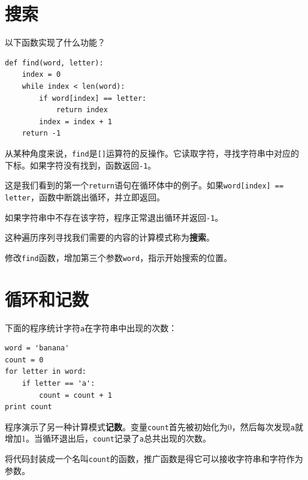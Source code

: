 

\section{搜索}
\label{查找}

以下函数实现了什么功能？


\beforeverb
\begin{verbatim}
def find(word, letter):
    index = 0
    while index < len(word):
        if word[index] == letter:
            return index
        index = index + 1
    return -1
\end{verbatim}
\afterverb
%
从某种角度来说，{\tt find}是{\tt []}运算符的反操作。它读取字符，寻找字符串中对应的下标。如果字符没有找到，函数返回{\tt -1}。

这是我们看到的第一个{\tt return}语句在循环体中的例子。如果{\tt word[index] == letter}，函数中断跳出循环，并立即返回。

如果字符串中不存在该字符，程序正常退出循环并返回{\tt -1}。

这种遍历序列寻找我们需要的内容的计算模式称为{\bf 搜索}。


\begin{ex}
修改{\tt find}函数，增加第三个参数{\tt word}，指示开始搜索的位置。
\end{ex}


\section{循环和记数}
\label{记数}


下面的程序统计字符{\tt a}在字符串中出现的次数：

\beforeverb
\begin{verbatim}
word = 'banana'
count = 0
for letter in word:
    if letter == 'a':
        count = count + 1
print count
\end{verbatim}
\afterverb
%
程序演示了另一种计算模式{\bf 记数}。变量{\tt count}首先被初始化为0，然后每次发现{\tt a}就增加1。当循环退出后，{\tt count}记录了{\tt a}总共出现的次数。

\begin{ex}

将代码封装成一个名叫{\tt count}的函数，推广函数是得它可以接收字符串和字符作为参数。

\end{ex}

